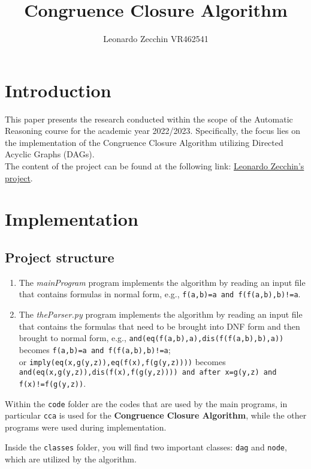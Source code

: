 \documentclass{article}
\title{Congruence Closure Algorithm}
\author{Leonardo Zecchin VR462541}
\begin{document}
\maketitle


\section{Introduction}

This paper presents the research conducted within the scope of the Automatic Reasoning course for the academic year 2022/2023. Specifically, the focus lies on the implementation of the Congruence Closure Algorithm utilizing Directed Acyclic Graphs (DAGs).\\
The content of the project can be found at the following link: \href{https://github.com/leonardozecchin/congruence-closure-AR.git}{Leonardo Zecchin's project}.

\section{Implementation}

\subsection{Project structure}

\begin{enumerate}
\item The \textit{mainProgram} program implements the algorithm by reading an input file that contains formulas in normal form, e.g., \texttt{f(a,b)=a and f(f(a,b),b)!=a}.
\item The \textit{theParser.py} program implements the algorithm by reading an input file that contains the formulas that need to be brought into DNF form and then brought to normal form, e.g., \texttt{and(eq(f(a,b),a),dis(f(f(a,b),b),a))} becomes \texttt{f(a,b)=a and f(f(a,b),b)!=a};\\ or \texttt{imply(eq(x,g(y,z)),eq(f(x),f(g(y,z))))} becomes \texttt{and(eq(x,g(y,z)),dis(f(x),f(g(y,z)))) and after \texttt{x=g(y,z) and f(x)!=f(g(y,z))}}.
\end{enumerate}

Within the \texttt{code} folder are the codes that are used by the main programs, in particular \texttt{cca} is used for the \textbf{Congruence Closure Algorithm}, while the other programs were used during implementation.

Inside the \texttt{classes} folder, you will find two important classes: \texttt{dag} and \texttt{node}, which are utilized by the algorithm.
\end{document}

